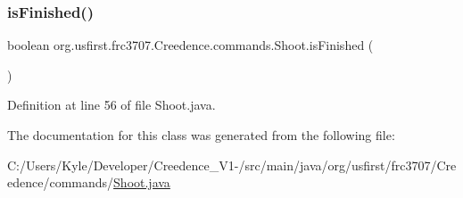 \subsubsection{\texorpdfstring{isFinished()}{isFinished()}}
{\footnotesize\ttfamily boolean org.\+usfirst.\+frc3707.\+Creedence.\+commands.\+Shoot.\+is\+Finished (\begin{DoxyParamCaption}{ }\end{DoxyParamCaption})\hspace{0.3cm}{\ttfamily [protected]}}



Definition at line 56 of file Shoot.\+java.



The documentation for this class was generated from the following file\+:\begin{DoxyCompactItemize}
\item 
C\+:/\+Users/\+Kyle/\+Developer/\+Creedence\+\_\+\+V1-\//src/main/java/org/usfirst/frc3707/\+Creedence/commands/\mbox{\hyperlink{_shoot_8java}{Shoot.\+java}}\end{DoxyCompactItemize}
